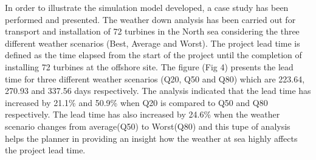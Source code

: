 In order to illustrate the simulation model developed, a case study has been performed and presented. The weather down analysis has been carried out for transport and installation of 72 turbines in the North sea considering the three different weather scenarios (Best, Average and Worst). The project lead time is defined as the time elapsed from the start of the project until the completion of installing 72 turbines at the offshore site. The figure (Fig 4) presents the lead time for three different weather scenarios (Q20, Q50 and Q80) which are 223.64, 270.93 and 337.56 days respectively. The analysis indicated that the lead time has increased by 21.1\% and 50.9\% when Q20 is compared to Q50 and Q80 respectively. The lead time has also increased by 24.6\% when the weather scenario changes from average(Q50) to Worst(Q80) and this tupe of analysis helps the planner in providing an insight how the weather at sea highly affects the project lead time. 

